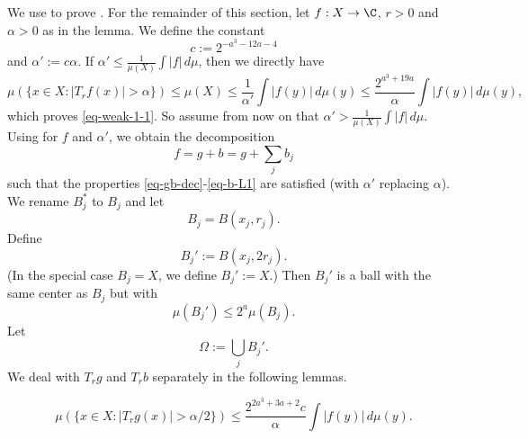 We use  to prove . For the remainder of this section, let $f:X\to\C$, $r>0$ and $\alpha>0$ as in the lemma.
We define the constant
\begin{equation} \label{weak-1-1-proof-cz-const}
    c:= 2^{-a^3-12a-4}
\end{equation}
and $\alpha' := c\alpha$. If $\alpha'\le\frac{1}{\mu(X)}\int |f|\,d\mu$, then we directly have
\begin{equation*}
    \mu\left(\{x\in X: |T_r f(x)|>\alpha\}\right)\le \mu(X) \le \frac{1}{\alpha'} \int |f(y)|\, d\mu(y)
    \le \frac{2^{a^3 + 19a}}{\alpha} \int |f(y)|\, d\mu(y),
\end{equation*}
which proves \eqref{eq-weak-1-1}.
So assume from now on that $\alpha'>\frac{1}{\mu(X)}\int |f|\,d\mu$.
Using  for $f$ and $\alpha'$, we obtain the decomposition
\begin{equation*}
    f=g+b=g+\sum_j b_j
\end{equation*}
such that the properties \eqref{eq-gb-dec}-\eqref{eq-b-L1} are satisfied (with $\alpha'$ replacing $\alpha$). We rename $B_j^*$ to $B_j$ and let
\begin{equation}
    \label{eq-Ij-cj}
    B_j=B(x_j, r_j).
\end{equation}
Define
\begin{equation}
    \label{eq-Ij*}
    B_j':=B(x_j, 2r_j).
\end{equation}
(In the special case $B_j=X$, we define $B_j':=X$.)
Then $B_j'$ is a ball with the same center as $B_j$ but with
\begin{equation}
    \label{eq-Ij*-dim}
    \mu(B_j')\le 2^{a} \mu(B_j).
\end{equation}
Let
\begin{equation}
    \label{eq-omega}
    \Omega:=\bigcup_j B_j'.
\end{equation}
We deal with $T_rg$ and $T_rb$ separately in the following lemmas.

\begin{lemma}
    \label{estimate-good}
    \leanok
    \begin{equation*}
        \mu\left(\{x\in X: |T_r g(x)|>{\alpha}/2\}\right)
        \le \frac{2^{2a^3+3a+2}c}{\alpha} \int |f(y)|\, d\mu(y).
    \end{equation*}

\end{lemma}

